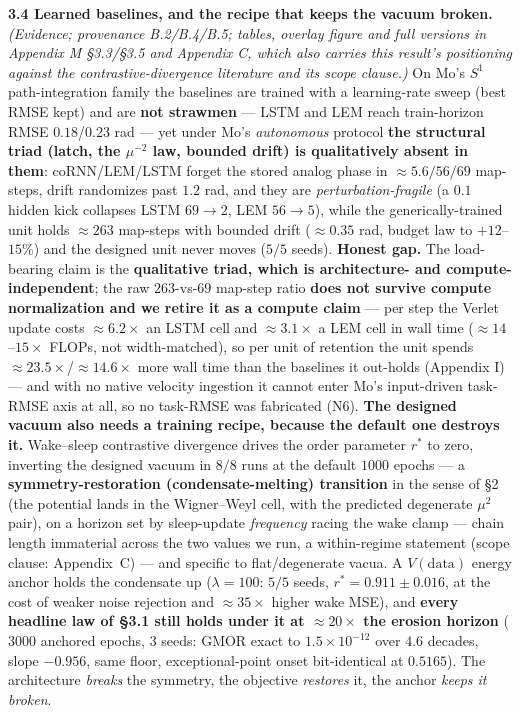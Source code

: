 \documentclass[10pt]{article}
\begin{document}
\textbf{3.4 Learned baselines, and the recipe that keeps the vacuum broken.} \emph{(Evidence; provenance B.2/B.4/B.5; tables, overlay figure and full versions in Appendix M \S3.3/\S3.5 and Appendix C, which also carries this result's positioning against the contrastive-divergence literature and its scope clause.)} On Mo's $S^1$ path-integration family the baselines are trained with a learning-rate sweep (best RMSE kept) and are \textbf{not strawmen} --- LSTM and LEM reach train-horizon RMSE $0.18$/$0.23$ rad --- yet under Mo's \emph{autonomous} protocol \textbf{the structural triad (latch, the $\mu^{-2}$ law, bounded drift) is qualitatively absent in them}: coRNN/LEM/LSTM forget the stored analog phase in $\approx5.6/56/69$ map-steps, drift randomizes past $1.2$ rad, and they are \emph{perturbation-fragile} (a $0.1$ hidden kick collapses LSTM $69\to2$, LEM $56\to5$), while the generically-trained unit holds $\approx263$ map-steps with bounded drift ($\approx0.35$ rad, budget law to $+12$--$15\%$) and the designed unit never moves ($5/5$ seeds). \textbf{Honest gap.} The load-bearing claim is the \textbf{qualitative triad, which is architecture- and compute-independent}; the raw $263$-vs-$69$ map-step ratio \textbf{does not survive compute normalization and we retire it as a compute claim} --- per step the Verlet update costs $\approx6.2\times$ an LSTM cell and $\approx3.1\times$ a LEM cell in wall time ($\approx14$--$15\times$ FLOPs, not width-matched), so per unit of retention the unit spends $\approx23.5\times$/$\approx14.6\times$ more wall time than the baselines it out-holds (Appendix I) --- and with no native velocity ingestion it cannot enter Mo's input-driven task-RMSE axis at all, so no task-RMSE was fabricated (N6). \textbf{The designed vacuum also needs a training recipe, because the default one destroys it.} Wake--sleep contrastive divergence drives the order parameter $r^*$ to zero, inverting the designed vacuum in $8/8$ runs at the default $1000$ epochs --- a \textbf{symmetry-restoration (condensate-melting) transition} in the sense of \S2 (the potential lands in the Wigner--Weyl cell, with the predicted degenerate $\mu^2$ pair), on a horizon set by sleep-update \emph{frequency} racing the wake clamp --- chain length immaterial across the two values we run, a within-regime statement (scope clause: Appendix~C) --- and specific to flat/degenerate vacua. A $V(\text{data})$ energy anchor holds the condensate up ($\lambda=100$: $5/5$ seeds, $r^*=0.911\pm0.016$, at the cost of weaker noise rejection and $\approx35\times$ higher wake MSE), and \textbf{every headline law of \S3.1 still holds under it at $\approx20\times$ the erosion horizon} ($3000$ anchored epochs, $3$ seeds: GMOR exact to $1.5\!\times\!10^{-12}$ over $4.6$ decades, slope $-0.956$, same floor, exceptional-point onset bit-identical at $0.5165$). The architecture \emph{breaks} the symmetry, the objective \emph{restores} it, the anchor \emph{keeps it broken}.
\end{document}
